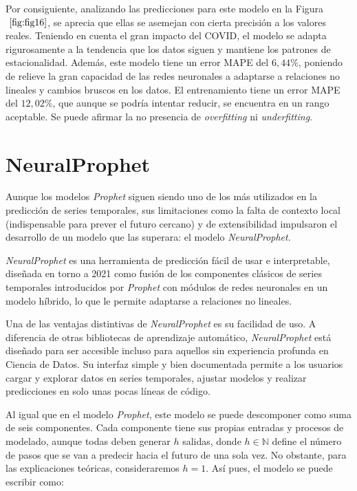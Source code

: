 \documentclass[12pt,twoside]{article}
\begin{document}
Por consiguiente, analizando las predicciones para este modelo en la Figura $~\ref{fig:fig16}$, se aprecia que ellas se asemejan con cierta precisión a los valores reales. Teniendo en cuenta el gran impacto del COVID, el modelo se adapta rigurosamente a la tendencia que los datos siguen y mantiene los patrones de estacionalidad. Además, este modelo tiene un error MAPE del $6,44\%$, poniendo de relieve la gran capacidad de las redes neuronales a adaptarse a relaciones no lineales y cambios bruscos en los datos. El entrenamiento tiene un error MAPE del $12,02\%$, que aunque se podría intentar reducir, se encuentra en un rango aceptable. Se puede afirmar la no presencia de \textit{overfitting} ni \textit{underfitting}.

\newpage

\section{NeuralProphet}\label{sec:21}

Aunque los modelos \textit{Prophet} siguen siendo uno de los más utilizados en la predicción de series temporales, sus limitaciones como la falta de contexto local (indispensable para prever el futuro cercano) y de extensibilidad impulsaron el desarrollo de un modelo que las superara: el modelo \textit{NeuralProphet}. 

\textit{NeuralProphet} \cite{np1} es una herramienta de predicción fácil de usar e interpretable, diseñada en torno a 2021 como fusión de los componentes clásicos de series temporales introducidos por \textit{Prophet} con módulos de redes neuronales en un modelo híbrido, lo que le permite adaptarse a relaciones no lineales. 

Una de las ventajas distintivas de \textit{NeuralProphet} es su facilidad de uso. A diferencia de otras bibliotecas de aprendizaje automático, \textit{NeuralProphet} está diseñado para ser accesible incluso para aquellos sin experiencia profunda en Ciencia de Datos. Su interfaz simple y bien documentada permite a los usuarios cargar y explorar datos en series temporales, ajustar modelos y realizar predicciones en solo unas pocas líneas de código.

Al igual que en el modelo \textit{Prophet}, este modelo se puede descomponer como suma de seis componentes. Cada componente tiene sus propias entradas y procesos de modelado, aunque todas deben generar $h$ salidas, donde $h \in \mathbb{N}$ define el número de pasos que se van a predecir hacia el futuro de una sola vez. No obstante, para las explicaciones teóricas, consideraremos $h=1$. Así pues, el modelo se puede escribir como: 
\end{document}
